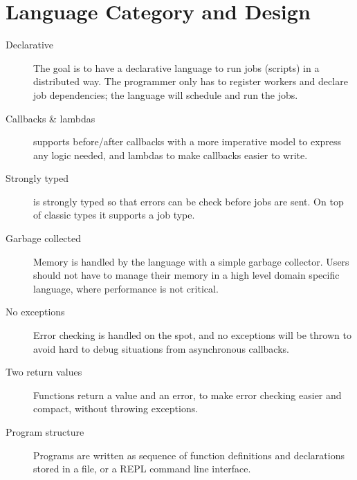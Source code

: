 \section{Language Category and Design}
\label{sect:desg}
\begin{description}
\item[Declarative] The goal is to have a declarative language to run jobs
(scripts) in a distributed way. The programmer only has to register workers and
declare job dependencies; the language will schedule and run the jobs.
\item[Callbacks \& lambdas] \lang{} supports before/after callbacks
with a more imperative model to express any logic needed, and
lambdas to make callbacks easier to write.
\item[Strongly typed] \lang{} is strongly typed so that errors can be check
before jobs are sent. On top of classic types it supports a job type.
\item[Garbage collected] Memory is handled by the language with a simple
garbage collector. Users should not have to manage their memory in a high
level domain specific language, where performance is not critical.
\item[No exceptions] Error checking is handled on the spot, and no exceptions
will be thrown to avoid hard to debug situations from asynchronous callbacks.
\item[Two return values] Functions return a value and an error, to make error
checking easier and compact, without throwing exceptions.
\item[Program structure] Programs are written as sequence of function
definitions and declarations stored in a file, or a REPL command line
interface.
\end{description}
